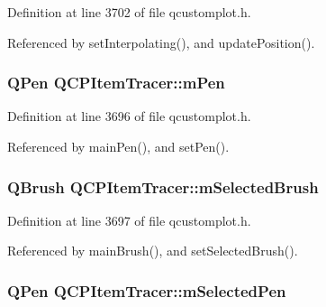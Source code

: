Definition at line 3702 of file qcustomplot.\+h.



Referenced by set\+Interpolating(), and update\+Position().

\hypertarget{class_q_c_p_item_tracer_a579e3bd6bd16d6aaff03638dc8a99a69}{}
\subsubsection[{m\+Pen}]{\setlength{\rightskip}{0pt plus 5cm}Q\+Pen Q\+C\+P\+Item\+Tracer\+::m\+Pen\hspace{0.3cm}{\ttfamily [protected]}}\label{class_q_c_p_item_tracer_a579e3bd6bd16d6aaff03638dc8a99a69}


Definition at line 3696 of file qcustomplot.\+h.



Referenced by main\+Pen(), and set\+Pen().

\hypertarget{class_q_c_p_item_tracer_a1c15d2adde40efdcc0ef1ff78fd256a6}{}
\subsubsection[{m\+Selected\+Brush}]{\setlength{\rightskip}{0pt plus 5cm}Q\+Brush Q\+C\+P\+Item\+Tracer\+::m\+Selected\+Brush\hspace{0.3cm}{\ttfamily [protected]}}\label{class_q_c_p_item_tracer_a1c15d2adde40efdcc0ef1ff78fd256a6}


Definition at line 3697 of file qcustomplot.\+h.



Referenced by main\+Brush(), and set\+Selected\+Brush().

\hypertarget{class_q_c_p_item_tracer_a3f61829784200819661d1e2a5354d866}{}
\subsubsection[{m\+Selected\+Pen}]{\setlength{\rightskip}{0pt plus 5cm}Q\+Pen Q\+C\+P\+Item\+Tracer\+::m\+Selected\+Pen\hspace{0.3cm}{\ttfamily [protected]}}\label{class_q_c_p_item_tracer_a3f61829784200819661d1e2a5354d866}


